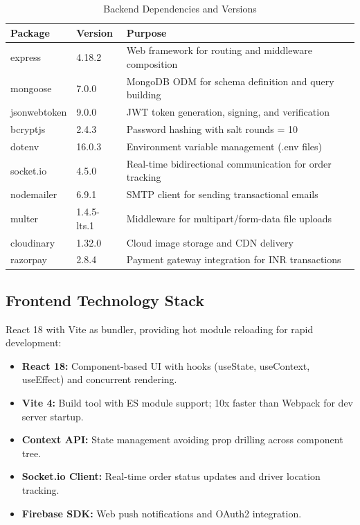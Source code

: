 \documentclass[12pt,a4paper]{report}
\begin{document}
\begin{itemize}
\begin{table}[H]
\centering
\caption{Backend Dependencies and Versions}
\begin{tabular}{p{3.5cm} p{2cm} p{4cm}}
\toprule
\textbf{Package} & \textbf{Version} & \textbf{Purpose} \\
\midrule
express & 4.18.2 & Web framework for routing and middleware composition \\
mongoose & 7.0.0 & MongoDB ODM for schema definition and query building \\
jsonwebtoken & 9.0.0 & JWT token generation, signing, and verification \\
bcryptjs & 2.4.3 & Password hashing with salt rounds = 10 \\
dotenv & 16.0.3 & Environment variable management (.env files) \\
socket.io & 4.5.0 & Real-time bidirectional communication for order tracking \\
nodemailer & 6.9.1 & SMTP client for sending transactional emails \\
multer & 1.4.5-lts.1 & Middleware for multipart/form-data file uploads \\
cloudinary & 1.32.0 & Cloud image storage and CDN delivery \\
razorpay & 2.8.4 & Payment gateway integration for INR transactions \\
\bottomrule
\end{tabular}
\end{table}

\subsection{Frontend Technology Stack}
React 18 with Vite as bundler, providing hot module reloading for rapid development:

\begin{itemize}
    \item \textbf{React 18:} Component-based UI with hooks (useState, useContext, useEffect) and concurrent rendering.
    \item \textbf{Vite 4:} Build tool with ES module support; 10x faster than Webpack for dev server startup.
    \item \textbf{Context API:} State management avoiding prop drilling across component tree.
    \item \textbf{Socket.io Client:} Real-time order status updates and driver location tracking.
    \item \textbf{Firebase SDK:} Web push notifications and OAuth2 integration.
\end{itemize}


\end{itemize}
\end{document}
